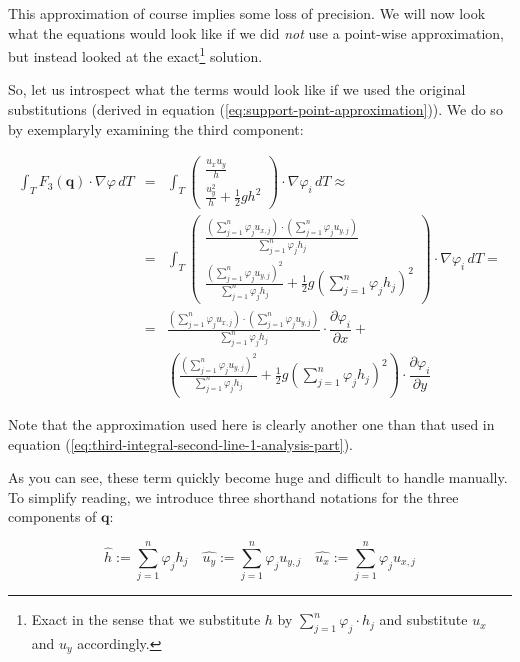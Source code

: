 \documentclass{article}
\newcommand{\pd}[2]{\dfrac{\partial #1}{\partial #2}}
\renewcommand{\phi}{\varphi}
\begin{document}
This approximation of course implies some loss of precision. We will now look what the equations would look like if we did \emph{not} use a point-wise approximation, but instead looked at the exact\footnote{Exact in the sense that we substitute $h$ by $\sum_{j=1}^n \phi_j \cdot h_j$ and substitute $u_x$ and $u_y$ accordingly.} solution.

So, let us introspect what the terms would look like if we used the original substitutions (derived in equation (\ref{eq:support-point-approximation})). We do so by exemplaryly examining the third component:

\begin{eqnarray*}
  \int_T F_3\left(\mathbf{q}\right) \cdot \nabla \phi \, dT & = &
  \int_T
  \begin{pmatrix}
    \frac{u_x u_y}{h} \\ \frac{u_y^2}{h} + \frac{1}{2} g h^2
  \end{pmatrix}
  \cdot \nabla \phi_i \, dT \approx \\
  & = & \int_T
  \begin{pmatrix}
    \frac{(\sum_{j=1}^n \phi_j u_{x,j}) \cdot (\sum_{j=1}^n \phi_j u_{y,j})}{\sum_{j=1}^n \phi_j h_j} \\ \frac{(\sum_{j=1}^n \phi_j u_{y,j})^2}{\sum_{j=1}^n \phi_j h_j} + \frac{1}{2} g (\sum_{j=1}^n \phi_j h_j)^2
  \end{pmatrix}
  \cdot \nabla \phi_i \, dT = \\
  & = & 
  \frac{(\sum_{j=1}^n \phi_j u_{x,j}) \cdot (\sum_{j=1}^n \phi_j u_{y,j})}{\sum_{j=1}^n \phi_j h_j} \cdot \pd{\phi_i}{x} + \\
  & & \left( \frac{(\sum_{j=1}^n \phi_j u_{y,j})^2}{\sum_{j=1}^n \phi_j h_j} + \frac{1}{2} g (\sum_{j=1}^n \phi_j h_j)^2 \right) \cdot \pd{\phi_i}{y}
\end{eqnarray*}

Note that the approximation used here is clearly another one than that used in equation (\ref{eq:third-integral-second-line-1-analysis-part}).

As you can see, these term quickly become huge and difficult to handle manually. To simplify reading, we introduce three shorthand notations for the three components of $\mathbf{q}$:

\begin{equation}
  \label{eq:substitutions-for-all-components-with-hat}
  \widehat{h} := \sum_{j=1}^n \phi_j h_j \quad 
  \widehat{u_y} := \sum_{j=1}^n \phi_j u_{y,j} \quad
  \widehat{u_x} := \sum_{j=1}^n \phi_j u_{x,j}
\end{equation}
\end{document}
